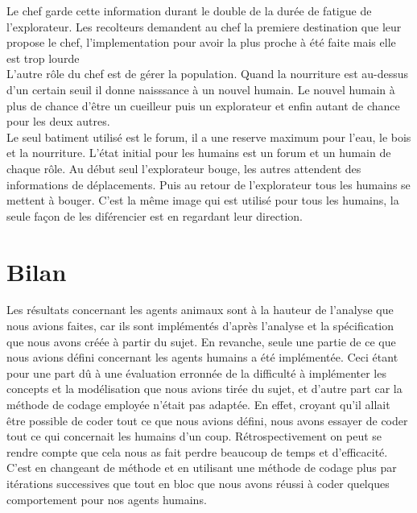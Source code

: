 \documentclass[12pt]{article}
\begin{document}
Le chef garde cette information durant le double de la durée de fatigue de l'explorateur.
Les recolteurs demandent au chef la premiere destination que leur propose le chef, l'implementation pour avoir la plus proche à été faite mais elle est trop lourde\\
L'autre rôle du chef est de gérer la population. Quand la nourriture est au-dessus d'un certain seuil il donne naisssance à un nouvel humain.
Le nouvel humain à plus de chance d'être un cueilleur puis un explorateur et enfin autant de chance pour les deux autres.\\
Le seul batiment utilisé est le forum, il a une reserve maximum pour l'eau, le bois et la nourriture.
L'état initial pour les humains est un forum et un humain de chaque rôle.
Au début seul l'explorateur bouge, les autres attendent des informations de déplacements. Puis au retour de l'explorateur tous les humains se mettent à bouger.
C'est la même image qui est utilisé pour tous les humains, la seule façon de les diférencier est en regardant leur direction.



\section{Bilan}

Les résultats concernant les agents animaux sont à la hauteur de l'analyse 
que nous avions faites, car ils sont implémentés d'après l'analyse et la 
spécification que nous avons créée à partir du sujet. En revanche, seule une 
partie de ce que nous avions défini concernant les agents humains a été 
implémentée. Ceci étant pour une part dû à une évaluation erronnée de la 
difficulté à implémenter les concepts et la modélisation que nous avions 
tirée du sujet, et d'autre part car la méthode de codage employée n'était pas 
adaptée. En effet, croyant qu'il allait être possible de coder tout ce que nous 
avions défini, nous avons essayer de coder tout ce qui concernait les humains 
d'un coup. Rétrospectivement on peut se rendre compte que cela nous as fait 
perdre beaucoup de temps et d'efficacité. C'est en changeant de méthode et en 
utilisant une méthode de codage plus par itérations successives que tout en 
bloc que nous avons réussi à coder quelques comportement pour nos agents humains.
\end{document}
